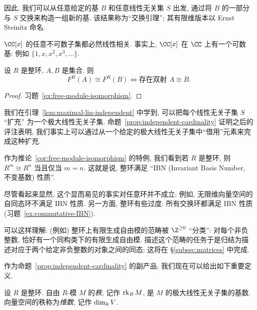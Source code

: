 因此, 我们可以从任意给定的基 $B$ 和任意线性无关集 $S$ 出发, 通过将 $B$ 的一部分与 $S$ 交换来构造一组新的基. 该结果称为``交换引理''; 其有限维版本以 Ernst Steinitz 命名.

\begin{example}\label{ex:uncountable-dependent}
$\CC[x]$ 的任意不可数子集都必然线性相关. 事实上, $\CC[x]$ 在 $\CC$ 上有一个可数基: 例如 $\{1,x,x^2,x^3,\dots\}$.
\end{example}

\begin{corollary}\label{cor:free-module-isomorphism}
设 $R$ 是整环, $A,B$ 是集合. 则
\[
F^R(A)\cong F^R(B) \iff \text{存在双射 } A\cong B.
\]
\end{corollary}

\begin{proof}
习题~\ref{ex:free-module-isomorphism}.
\end{proof}

\begin{remark}\label{rmk:completing-independent}
我们在引理~\ref{lem:maximal-lin-independent} 中学到, 可以把每个线性无关子集 $S$ ``扩充'' 为一个极大线性无关子集. 命题~\ref{prop:independent-cardinality} 证明之后的评注表明, 我们事实上可以通过从一个给定的极大线性无关子集中``借用''元素来完成这种扩充.
\end{remark}

\begin{remark}\label{rmk:IBN}
作为推论~\ref{cor:free-module-isomorphism} 的特例, 我们看到若 $R$ 是整环, 则 $R^m\cong R^n$ 当且仅当 $m=n$. 这就是说, 整环满足 ``IBN (Invariant Basis Number, 不变基数) 性质''.

尽管看起来显然, 这个显而易见的事实对任意环并不成立: 例如, 无限维向量空间的自同态环不满足 IBN 性质. 另一方面, 整环有些过度: 所有交换环都满足 IBN 性质 (习题~\ref{ex:commutative-IBN}).
\end{remark}

可以这样理解: (例如) 整环上有限生成自由模的范畴被 $\Z^{\ge 0}$ ``分类'': 对每个非负整数, 恰好有一个同构类下的有限生成自由模. 描述这个范畴的任务于是归结为描述对应于两个给定非负整数的对象之间的同态; 这将在 §\ref{subsec:matrices} 中完成.

作为命题~\ref{prop:independent-cardinality} 的副产品, 我们现在可以给出如下重要定义.

\begin{definition}\label{def:rank}
设 $R$ 是整环. 自由 $R$-模 $M$ 的\emph{秩}, 记作 $\operatorname{rk}_R M$, 是 $M$ 的极大线性无关子集的基数. 向量空间的秩称为\emph{维数}, 记作 $\operatorname{dim}_k V$.
\end{definition}


